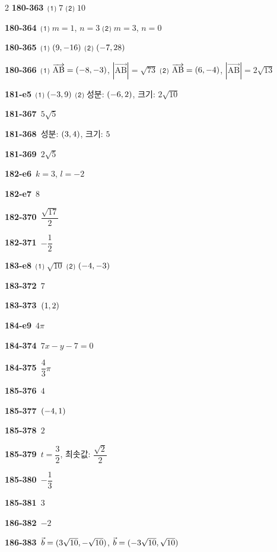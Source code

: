 \documentclass[10pt,a4paper]{article}
\newcommand{\pt}[1]{\mathrm{#1}}
\begin{document}
\begin{multicols}{2}
\noindent\textbf{180-363}\ ⑴ $7$ ⑵ $10$\par
\noindent\textbf{180-364}\ ⑴ $m=1$, $n=3$ ⑵ $m=3$, $n=0$\par
\noindent\textbf{180-365}\ ⑴ $(9{,}\mkern3mu\mathopen{}-16)$ ⑵ $(-7{,}\mkern3mu\mathopen{}28)$\par
\noindent\textbf{180-366}\ ⑴ $\overrightarrow{\pt{AB}}=(-8{,}\mkern3mu\mathopen{}-3)$, $|\overrightarrow{\pt{AB}}|=\sqrt{73}$ ⑵ $\overrightarrow{\pt{AB}}=(6{,}\mkern3mu\mathopen{}-4)$, $|\overrightarrow{\pt{AB}}|=2\sqrt{13}$\par
\noindent\textbf{181-e5}\ ⑴ $(-3{,}\mkern3mu\mathopen{}9)$ ⑵ 성분: $(-6{,}\mkern3mu\mathopen{}2)$, 크기: $2\sqrt{10}$\par
\noindent\textbf{181-367}\ $5\sqrt{5}$\par
\noindent\textbf{181-368}\ 성분: $(3{,}\mkern3mu\mathopen{}4)$, 크기: $5$\par
\noindent\textbf{181-369}\ $2\sqrt{5}$\par
\noindent\textbf{182-e6}\ $k=3$, $l=-2$\par
\noindent\textbf{182-e7}\ $8$\par
\noindent\textbf{182-370}\ $\dfrac{\sqrt{17}}{2}$\par
\noindent\textbf{182-371}\ $-\dfrac{1}{2}$\par
\noindent\textbf{183-e8}\ ⑴ $\sqrt{10}$ ⑵ $(-4{,}\mkern3mu\mathopen{}-3)$\par
\noindent\textbf{183-372}\ $7$\par
\noindent\textbf{183-373}\ $(1{,}\mkern3mu\mathopen{}2)$\par
\noindent\textbf{184-e9}\ $4\pi$\par
\noindent\textbf{184-374}\ $7x-y-7=0$\par
\noindent\textbf{184-375}\ $\dfrac{4}{3}\pi$\par
\noindent\textbf{185-376}\ $4$\par
\noindent\textbf{185-377}\ $(-4{,}\mkern3mu\mathopen{}1)$\par
\noindent\textbf{185-378}\ $2$\par
\noindent\textbf{185-379}\ $t=\dfrac{3}{2}$, 최솟값: $\dfrac{\sqrt{2}}{2}$\par
\noindent\textbf{185-380}\ $-\dfrac{1}{3}$\par
\noindent\textbf{185-381}\ $3$\par
\noindent\textbf{186-382}\ $-2$\par
\noindent\textbf{186-383}\ $\vec{b}=(3\sqrt{10}{,}\mkern3mu\mathopen{}-\sqrt{10})$, $\vec{b}=(-3\sqrt{10}{,}\mkern3mu\mathopen{}\sqrt{10})$\par

\end{multicols}
\end{document}
